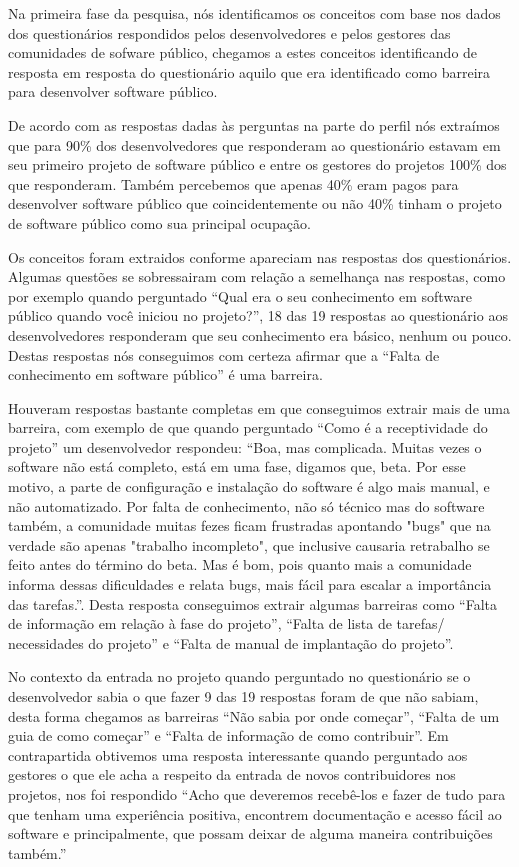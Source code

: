 Na primeira fase da pesquisa, nós identificamos os conceitos com base nos dados 
dos questionários respondidos pelos desenvolvedores e pelos gestores das comunidades de
sofware público, chegamos a estes conceitos identificando de resposta em resposta 
do questionário aquilo que era identificado como barreira para desenvolver 
software público.

De acordo com as respostas dadas às perguntas na parte do perfil nós extraímos
que para 90\% dos desenvolvedores que responderam ao questionário estavam 
em seu primeiro projeto de software público e entre os gestores do projetos
100\% dos que responderam. Também percebemos que apenas
40\% eram pagos para desenvolver software público que coincidentemente ou não
40\% tinham o projeto de software público como sua principal ocupação.

Os conceitos foram extraidos conforme apareciam nas respostas dos questionários.
Algumas questões se sobressairam com relação a semelhança nas respostas, como 
por exemplo quando perguntado ``Qual era o seu conhecimento em software público 
quando você iniciou no projeto?'', 18 das 19 respostas ao questionário aos desenvolvedores
responderam que seu conhecimento era básico, nenhum ou pouco. Destas respostas 
nós conseguimos com certeza afirmar que a ``Falta de conhecimento em software público''
é uma barreira.

Houveram respostas bastante completas em que conseguimos extrair mais de uma barreira,
com exemplo de que quando perguntado ``Como é a receptividade do projeto'' um desenvolvedor
respondeu: ``Boa, mas complicada. Muitas vezes o software não está completo, está em uma 
fase, digamos que, beta. Por esse motivo, a parte de configuração e instalação 
do software é algo mais manual, e não automatizado. Por falta de conhecimento, 
não só técnico mas do software também, a comunidade muitas fezes ficam frustradas 
apontando "bugs" que na verdade são apenas "trabalho incompleto", que inclusive 
causaria retrabalho se feito antes do término do beta. Mas é bom, pois quanto mais 
a comunidade informa dessas dificuldades e relata bugs, mais fácil para escalar a 
importância das tarefas.''. Desta resposta conseguimos extrair algumas barreiras 
como ``Falta de informação em relação à fase do projeto'', ``Falta de lista de tarefas/
necessidades do projeto'' e ``Falta de manual de implantação do projeto''.

No contexto da entrada no projeto quando perguntado no questionário se o desenvolvedor
sabia o que fazer 9 das 19 respostas foram de que não sabiam, desta forma chegamos as
barreiras ``Não sabia por onde começar'', ``Falta de um guia de como começar'' e ``Falta de 
informação de como contribuir''. Em contrapartida obtivemos uma resposta interessante 
quando perguntado aos gestores o que ele acha a respeito da entrada de novos contribuidores
nos projetos, nos foi respondido ``Acho que deveremos recebê-los e fazer de tudo 
para que tenham uma experiência positiva, encontrem documentação e acesso fácil ao 
software e principalmente, que possam deixar de alguma maneira contribuições também.''

